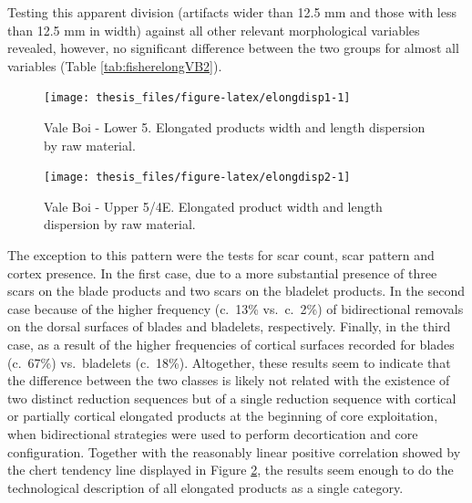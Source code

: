 \documentclass[12pt,twoside]{reedthesis}
\begin{document}
Testing this apparent division (artifacts wider than 12.5 mm and those with less than 12.5 mm in width) against all other relevant morphological variables revealed, however, no significant difference between the two groups for almost all variables (Table \ref{tab:fisherelongVB2}).
\begin{figure}[H]

{\centering \texttt{[image: thesis\_files/figure-latex/elongdisp1-1]} 

}

\caption{Vale Boi - Lower 5. Elongated products width and length dispersion by raw material.}\label{fig:elongdisp1}
\end{figure}
\begin{figure}[H]

{\centering \texttt{[image: thesis\_files/figure-latex/elongdisp2-1]} 

}

\caption{Vale Boi - Upper 5/4E. Elongated product width and length dispersion by raw material.}\label{fig:elongdisp2}
\end{figure}
The exception to this pattern were the tests for scar count, scar pattern and cortex presence. In the first case, due to a more substantial presence of three scars on the blade products and two scars on the bladelet products. In the second case because of the higher frequency (c.~13\% vs.~c.~2\%) of bidirectional removals on the dorsal surfaces of blades and bladelets, respectively. Finally, in the third case, as a result of the higher frequencies of cortical surfaces recorded for blades (c.~67\%) vs.~bladelets (c.~18\%). Altogether, these results seem to indicate that the difference between the two classes is likely not related with the existence of two distinct reduction sequences but of a single reduction sequence with cortical or partially cortical elongated products at the beginning of core exploitation, when bidirectional strategies were used to perform decortication and core configuration. Together with the reasonably linear positive correlation showed by the chert tendency line displayed in Figure \ref{fig:elongdisp2}, the results seem enough to do the technological description of all elongated products as a single category.
\end{document}
